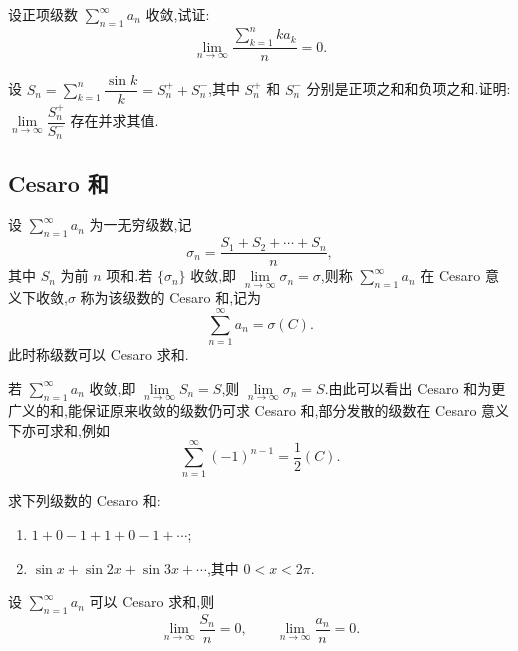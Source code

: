 \documentclass[../数学分析培优讲义.tex]{subfiles}
\begin{document}
\begin{example}[\markstar]
设正项级数 $\displaystyle\sum\limits_{n=1}^{\infty}a_n$ 收敛,试证:
\[
    \lim\limits_{n\to\infty}\dfrac{\sum\limits_{k=1}^nka_k}{n}=0.
\]
\end{example}
\exampleblank

\begin{example}
设 $\displaystyle S_n=\sum\limits_{k=1}^n\dfrac{\sin k}{k}=S_n^++S_n^-$,其中 $S_n^+$ 和 $S_n^-$ 分别是正项之和和负项之和.证明:$\displaystyle\lim\limits_{n\to\infty}\dfrac{S_n^+}{S_n^-}$ 存在并求其值.
\end{example}
\exampleblank


\newpage

\subsection{Cesaro 和}

\begin{definition}
设 $\displaystyle\sum\limits_{n=1}^{\infty}a_n$ 为一无穷级数,记
\[
    \sigma_n=\dfrac{S_1+S_2+\cdots+S_n}{n},
\]
其中 $S_n$ 为前 $n$ 项和.若 $\{\sigma_n\}$ 收敛,即 $\displaystyle\lim\limits_{n\to\infty}\sigma_n=\sigma$,则称 $\displaystyle\sum\limits_{n=1}^{\infty}a_n$ 在 Cesaro 意义下收敛,$\sigma$ 称为该级数的 Cesaro 和,记为
\[
    \sum\limits_{n=1}^{\infty}a_n=\sigma(C).
\]
此时称级数可以 Cesaro 求和.
\end{definition}

\begin{remark}
若 $\displaystyle\sum\limits_{n=1}^{\infty}a_n$ 收敛,即 $\displaystyle\lim\limits_{n\to\infty}S_n=S$,则 $\displaystyle\lim\limits_{n\to\infty}\sigma_n=S$.由此可以看出 Cesaro 和为更广义的和,能保证原来收敛的级数仍可求 Cesaro 和,部分发散的级数在 Cesaro 意义下亦可求和,例如
\[
    \sum\limits_{n=1}^{\infty}(-1)^{n-1}=\dfrac{1}{2}(C).
\]
\end{remark}

\begin{example}
求下列级数的 Cesaro 和:
\begin{enumerate}[label=(\arabic*)]
    \item $1+0-1+1+0-1+\cdots$;
    \item $\sin x+\sin2x+\sin3x+\cdots$,其中 $0<x<2\pi$.
\end{enumerate}
\end{example}
\exampleblank

\begin{example}
设 $\displaystyle\sum\limits_{n=1}^{\infty}a_n$ 可以 Cesaro 求和,则
\[
    \lim\limits_{n\to\infty}\dfrac{S_n}{n}=0,
    \qquad
    \lim\limits_{n\to\infty}\dfrac{a_n}{n}=0.
\]
\end{example}
\exampleblank
\end{document}

